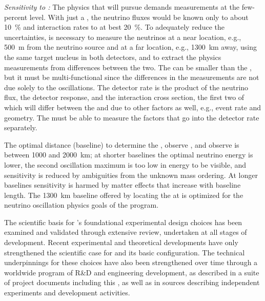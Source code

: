 \textit{Sensitivity to :}
The physics that  will pursue demands measurements at the few-percent level. With just a , the neutrino fluxes would be known only to about \SI{10}{\%} and interaction rates to at best \SI{20}{\%}.  To adequately reduce the uncertainties, is necessary to measure the neutrinos at a near location, e.g., \SI{500}{m} from the neutrino source and  at a far location, e.g., \SI{1300}{km} away, using the same target nucleus in both detectors, and to extract the physics measurements from differences between the two.  The  can be smaller than the , but it must be multi-functional since the differences in the measurements are not due solely to the oscillations.  The detector rate is the product of the neutrino flux, the detector response, and the interaction cross section, the first two of which will differ between the  and  due to other factors as well, e.g.,  event rate and geometry. The  must be able to measure the factors that go into the detector rate separately.  

The optimal  distance (baseline) to determine the , observe , and observe \deltacp is between \num{1000} and \SI{2000}{km}; at shorter baselines the optimal neutrino energy is lower, the second oscillation maximum is too low in energy to be visible, and  sensitivity is reduced by ambiguities from the unknown mass ordering. At longer baselines  sensitivity is harmed by matter effects that increase with baseline length. The \SI{1300}{km} baseline offered by locating the  at  is optimized for the neutrino oscillation physics goals of the  program.

 The scientific basis for 's foundational experimental
design choices has been examined and validated through extensive
review, undertaken at all stages of  development.
Recent experimental and theoretical developments have only
strengthened the scientific case for  and its
basic configuration.  The technical underpinnings for
these choices have also been strengthened over time through a worldwide
program of R\&D and engineering development, as described in a suite
of  project documents including this , as
well as in sources describing independent experiments and development
activities.

